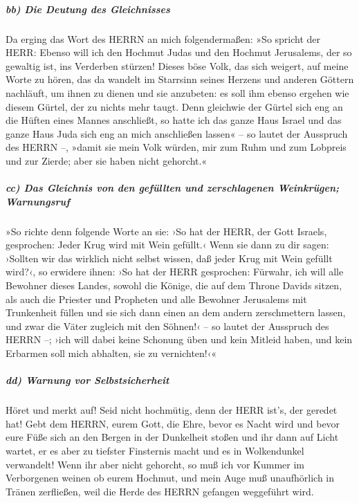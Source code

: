 \hypertarget{bb-die-deutung-des-gleichnisses}{%
\subparagraph{bb) Die Deutung des
Gleichnisses}\label{bb-die-deutung-des-gleichnisses}}

Da erging das Wort des HERRN an mich folgendermaßen:
»So spricht der HERR: Ebenso will ich den Hochmut Judas
und den Hochmut Jerusalems, der so gewaltig ist, ins Verderben stürzen!
Dieses böse Volk, das sich weigert, auf meine Worte zu
hören, das da wandelt im Starrsinn seines Herzens und anderen Göttern
nachläuft, um ihnen zu dienen und sie anzubeten: es soll ihm ebenso
ergehen wie diesem Gürtel, der zu nichts mehr taugt. Denn
gleichwie der Gürtel sich eng an die Hüften eines Mannes anschließt, so
hatte ich das ganze Haus Israel und das ganze Haus Juda sich eng an mich
anschließen lassen« -- so lautet der Ausspruch des HERRN --, »damit sie
mein Volk würden, mir zum Ruhm und zum Lobpreis und zur Zierde; aber sie
haben nicht gehorcht.«

\hypertarget{cc-das-gleichnis-von-den-gefuxfcllten-und-zerschlagenen-weinkruxfcgen-warnungsruf}{%
\subparagraph{cc) Das Gleichnis von den gefüllten und zerschlagenen
Weinkrügen;
Warnungsruf}\label{cc-das-gleichnis-von-den-gefuxfcllten-und-zerschlagenen-weinkruxfcgen-warnungsruf}}

»So richte denn folgende Worte an sie: ›So hat der HERR,
der Gott Israels, gesprochen: Jeder Krug wird mit Wein gefüllt.‹ Wenn
sie dann zu dir sagen: ›Sollten wir das wirklich nicht selbst wissen,
daß jeder Krug mit Wein gefüllt wird?‹, so erwidere
ihnen: ›So hat der HERR gesprochen: Fürwahr, ich will alle Bewohner
dieses Landes, sowohl die Könige, die auf dem Throne Davids sitzen, als
auch die Priester und Propheten und alle Bewohner Jerusalems mit
Trunkenheit füllen und sie sich dann einen an dem andern
zerschmettern lassen, und zwar die Väter zugleich mit den Söhnen!‹ -- so
lautet der Ausspruch des HERRN --; ›ich will dabei keine Schonung üben
und kein Mitleid haben, und kein Erbarmen soll mich abhalten, sie zu
vernichten!‹«

\hypertarget{dd-warnung-vor-selbstsicherheit}{%
\subparagraph{dd) Warnung vor
Selbstsicherheit}\label{dd-warnung-vor-selbstsicherheit}}

Höret und merkt auf! Seid nicht hochmütig, denn der HERR
ist's, der geredet hat! Gebt dem HERRN, eurem Gott, die
Ehre, bevor es Nacht wird und bevor eure Füße sich an den Bergen in der
Dunkelheit stoßen und ihr dann auf Licht wartet, er es aber zu tiefster
Finsternis macht und es in Wolkendunkel verwandelt! Wenn
ihr aber nicht gehorcht, so muß ich vor Kummer im Verborgenen weinen ob
eurem Hochmut, und mein Auge muß unaufhörlich in Tränen zerfließen, weil
die Herde des HERRN gefangen weggeführt wird.

